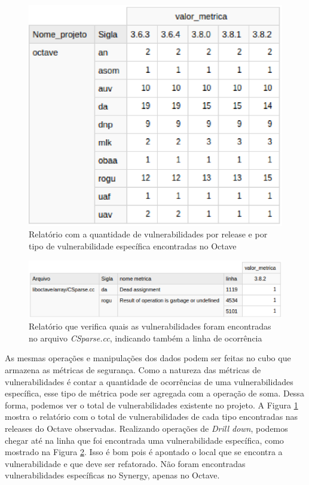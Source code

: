 \begin{figure}[H]
	\centering
	\includegraphics[scale=0.7]{figuras/dw-relatorio-octave}
	\caption{Relatório com a quantidade de vulnerabilidades por release e por tipo de vulnerabilidade específica encontradas no Octave}
	\label{dw-relatorio-octave}
\end{figure}

\begin{figure}[H]
	\centering
	\includegraphics[scale=0.7]{figuras/dw-sec-octave}
	\caption{Relatório que verifica quais as vulnerabilidades foram encontradas no arquivo \emph{CSparse.cc}, indicando também a linha de ocorrência}
	\label{dw-sec-octave}
\end{figure}

As mesmas operações e manipulações dos dados podem ser feitas no cubo que armazena as métricas de segurança. Como a natureza das métricas de vulnerabilidades é contar a quantidade de ocorrências de uma vulnerabilidades específica, esse tipo de métrica pode ser agregada com a operação de soma. Dessa forma, podemos ver o total de vulnerabilidades existente no projeto. A Figura \ref{dw-relatorio-octave} mostra o relatório com o total de vulnerabilidades de cada tipo encontradas nas releases do Octave observadas. Realizando operações de \emph{Drill down}, podemos chegar até na linha que foi encontrada uma vulnerabilidade específica, como mostrado na Figura \ref{dw-sec-octave}. Isso é bom pois é apontado o local que se encontra a vulnerabilidade e que deve ser refatorado. Não foram encontradas vulnerabilidades específicas no Synergy, apenas no Octave.


